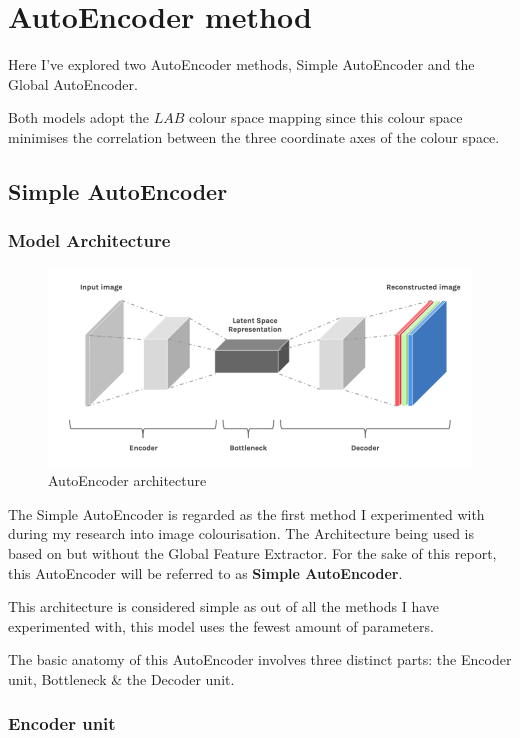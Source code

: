 \pagebreak
\section{AutoEncoder method}
Here I've explored two AutoEncoder methods, Simple AutoEncoder and the Global AutoEncoder. 

Both models adopt the \(LAB\) colour space mapping since this colour space minimises the correlation between the three coordinate axes of the colour space.  




\subsection{Simple AutoEncoder}


\subsubsection*{Model Architecture}
\begin{figure}[H]
    \centering
    \includegraphics[width=0.7\columnwidth]{sections/figures/autoencoder.png}
    \caption{AutoEncoder architecture}
    \label{fig:my_label}
\end{figure}

The Simple AutoEncoder is regarded as the first method I experimented with during my research into image colourisation. The Architecture being used is based on \cite{IizukaSIGGRAPH2016} but without the Global Feature Extractor. For the sake of this report, this AutoEncoder will be referred to as \textbf{Simple AutoEncoder}.

This architecture is considered simple as out of all the methods I have experimented with, this model uses the fewest amount of parameters.

The basic anatomy of this AutoEncoder involves three distinct parts: the Encoder unit, Bottleneck \& the Decoder unit.

\subsubsection*{Encoder unit}

